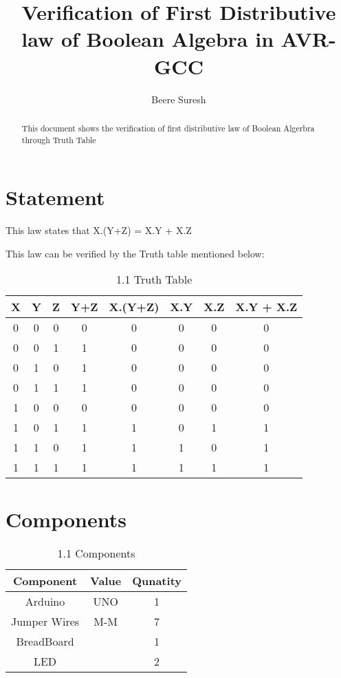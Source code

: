 \documentclass[journal,12pt,twocolumn]{IEEEtran}
\title{
Verification of First Distributive law of Boolean Algebra in AVR-GCC
}
\author{Beere Suresh}
\begin{document}
\maketitle
\begin{abstract}
This document shows the verification of first distributive law of Boolean Algerbra through Truth Table
\end{abstract}

\section{Statement}
This law states that 
X.(Y+Z) = X.Y + X.Z

This law can be verified by the Truth table mentioned below:

    \begin{table}[h]
    \centering
    \begin{tabular}{| c | c | c | c | c | c | c | c |}
    \hline
    \textbf{X} & \textbf{Y} & \textbf{Z} & \textbf{Y+Z} & \textbf{X.(Y+Z)} & \textbf{X.Y} & \textbf{X.Z} & \textbf{X.Y + X.Z} \\
    \hline
    0 & 0 & 0 & 0 & 0 & 0 & 0 & 0  \\
    \hline
    0 & 0 & 1 & 1 & 0 & 0 & 0 & 0  \\
    \hline
    0 & 1 & 0 & 1 & 0 & 0 & 0 & 0  \\
    \hline
    0 & 1 & 1 & 1 & 0 & 0 & 0 & 0  \\
    \hline
   1 & 0 & 0 & 0 & 0 & 0 & 0 & 0  \\
    \hline
    1 & 0 & 1 & 1 & 1 & 0 & 1 & 1  \\
    \hline
   1 & 1 & 0 & 1 & 1 & 1 & 0 & 1  \\
    \hline
    1 & 1 & 1 & 1 & 1 & 1 & 1 & 1  \\
    \hline
    \end{tabular}
    \caption{1.1 Truth Table}
    \label{tab:my_label}
 \end{table}



\section{Components}
\begin{table}[h]
    \centering
    \begin{tabular}{| c | c | c |}
       \hline
       \textbf{Component}  &  \textbf{Value}  &  \textbf{Qunatity}\\
       \hline
         Arduino  & UNO & 1  \\
         \hline
         Jumper Wires  &  M-M  &  7  \\
         \hline
         BreadBoard  &    &  1\\
         \hline
        LED   &   &  2 \\
          \hline
    \end{tabular}
    \caption{1.1 Components}
    \label{tab:my_label}
\end{table}
\end{document}
